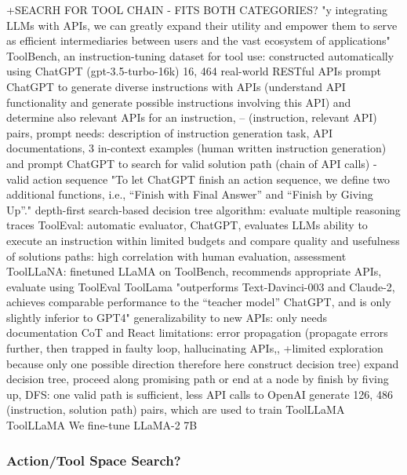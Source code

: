 \documentclass{article}
\begin{document}
+SEACRH FOR TOOL CHAIN - FITS BOTH CATEGORIES?
\cite{qin_toolllm_2023} 
"y integrating LLMs with APIs, we can greatly expand their utility and empower them to serve as efficient intermediaries between users and the vast ecosystem of applications"
ToolBench, an instruction-tuning dataset for tool use: constructed automatically using ChatGPT (gpt-3.5-turbo-16k)
16, 464 real-world RESTful APIs
prompt ChatGPT to generate diverse instructions with APIs (understand API functionality and generate possible instructions involving this API) and determine also relevant APIs for an instruction, -- (instruction, relevant API) pairs, prompt needs: description of instruction generation task, API documentations, 3 in-context examples (human written instruction generation)
and prompt ChatGPT to search for valid solution path (chain of API calls) - valid action sequence
"To let ChatGPT finish an action sequence, we define two additional functions, i.e., “Finish with Final Answer” and “Finish by Giving Up”."
depth-first search-based decision tree algorithm: evaluate multiple reasoning traces
ToolEval: automatic evaluator, ChatGPT, evaluates LLMs ability to execute an instruction within limited budgets and  compare quality and usefulness of solutions paths: high correlation with human evaluation, assessment
ToolLLaNA: finetuned LLaMA on ToolBench, recommends appropriate APIs, evaluate using ToolEval
ToolLama  "outperforms Text-Davinci-003 and Claude-2, achieves comparable performance to the “teacher model” ChatGPT, and is only slightly inferior to GPT4"
generalizability to new APIs: only needs documentation
CoT and React limitations: error propagation (propagate errors further, then trapped in faulty loop, hallucinating APIs,, +limited exploration because only one possible direction
therefore here construct decision tree)
expand decision tree, proceed along promising path or end at a node by finish by fiving up, DFS: one valid path is sufficient, less API calls to OpenAI
generate 126, 486 (instruction, solution path) pairs, which are used to train ToolLLaMA
ToolLLaMA We fine-tune LLaMA-2 7B

\subsubsection{Action/Tool Space Search?}
\end{document}
